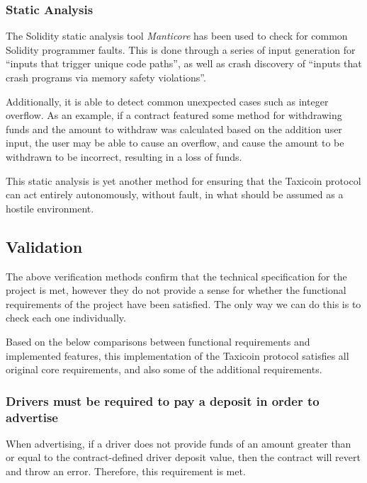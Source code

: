 
\subsubsection{Static Analysis}


The Solidity static analysis tool \textit{Manticore} has been used to check for common Solidity programmer faults. This is done through a series of input generation for \enquote{inputs that trigger unique code paths}, as well as crash discovery of \enquote{inputs that crash programs via memory safety violations}.

Additionally, it is able to detect common unexpected cases such as integer overflow. As an example, if a contract featured some method for withdrawing funds and the amount to withdraw was calculated based on the addition user input, the user may be able to cause an overflow, and cause the amount to be withdrawn to be incorrect, resulting in a loss of funds.

This static analysis is yet another method for ensuring that the Taxicoin protocol can act entirely autonomously, without fault, in what should be assumed as a hostile environment.

\subsection{Validation}


The above verification methods confirm that the technical specification for the project is met, however they do not provide a sense for whether the functional requirements of the project have been satisfied. The only way we can do this is to check each one individually.

Based on the below comparisons between functional requirements and implemented features, this implementation of the Taxicoin protocol satisfies all original core requirements, and also some of the additional requirements.

\subsubsection*{Drivers must be required to pay a deposit in order to advertise}

When advertising, if a driver does not provide funds of an amount greater than or equal to the contract-defined driver deposit value, then the contract will revert and throw an error. Therefore, this requirement is met.

